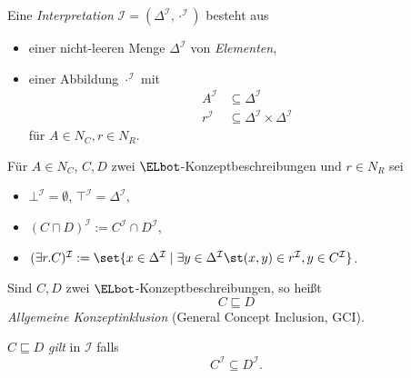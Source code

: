 \documentclass[ngerman]{beamer}
\begin{document}
\begin{frame}

  \onslide<+->
  \onslide<+->

  \begin{Definition}
    Eine \emph{Interpretation} $\mathcal{I} = (\Delta^{\mathcal{I}}, \cdot^{\mathcal{I}})$
    besteht aus
    \begin{itemize}
    \item<+-> einer nicht-leeren Menge $\Delta^{\mathcal{I}}$ von \emph{Elementen},
    \item<+-> einer Abbildung $\cdot^{\mathcal{I}}$ mit
      \begin{align*}
        A^{\mathcal{I}} &\subseteq \Delta^{\mathcal{I}} \\
        r^{\mathcal{I}} &\subseteq \Delta^{\mathcal{I}} \times \Delta^{\mathcal{I}}
      \end{align*}
      für $A \in N_{C}, r \in N_{R}$.
    \end{itemize}
  \end{Definition}

  \onslide<+->

  \begin{Definition}
    Für $A \in N_C$, $C, D$ zwei $\ELbot$-Konzeptbeschreibungen und $r \in N_R$ sei
    \begin{itemize}
    \item $\bot^{\mathcal{I}} = \emptyset$, $\top^{\mathcal{I}} = \Delta^{\mathcal{I}}$,
    \item $(C \sqcap D)^{\mathcal{I}} := C^{\mathcal{I}} \cap D^{\mathcal{I}}$,
    \item $(\exists r. C)^{\mathcal{I}} := \set{ x \in \Delta^{\mathcal{I}} \mid \exists y
        \in \Delta^{\mathcal{I}} \st (x, y) \in r^{\mathcal{I}}, y \in C^{\mathcal{I}} }$.
    \end{itemize}
  \end{Definition}

\end{frame}

\begin{frame}

  \onslide<+->

  \begin{Definition}
    Sind $C, D$ zwei $\ELbot$-Konzeptbeschreibungen, so heißt
    \begin{equation*}
      C \sqsubseteq D
    \end{equation*}
    \emph{Allgemeine Konzeptinklusion} (General Concept Inclusion, GCI).

    \onslide<+->%
    \medskip{}
    $C \sqsubseteq D$ \emph{gilt} in $\mathcal{I}$ falls
    \begin{equation*}
      C^{\mathcal{I}} \subseteq D^{\mathcal{I}}.
    \end{equation*}
  \end{Definition}

\end{frame}
\end{document}
